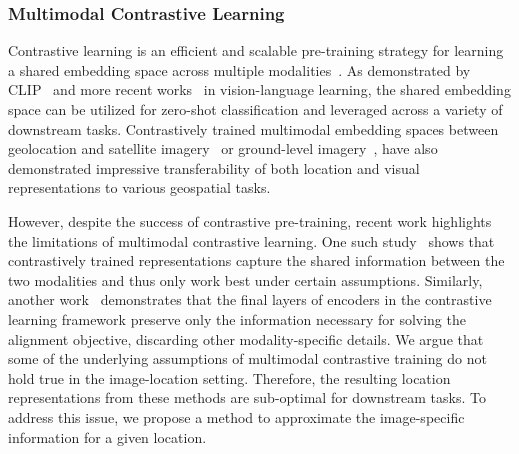 \subsubsection{Multimodal Contrastive Learning}
Contrastive learning is an efficient and scalable pre-training strategy for learning a shared embedding space across multiple modalities~\cite{radford2021learning,yang2022vision,yaofilip,li2021align,girdhar2023imagebind,elizalde2023clap,Dhakal_2024_CVPR,khanal2024psm,huynh2024contrastive,zheng2023exif}. As demonstrated by CLIP~\cite{radford2021learning} and more recent works~\cite{li2021align,yaofilip,yang2022vision} in vision-language learning, the shared embedding space can be utilized for zero-shot classification and leveraged across a variety of downstream tasks. Contrastively trained multimodal embedding spaces between geolocation and satellite imagery~\cite{klemmer2023satclip, mai2023csp} or ground-level imagery~\cite{vivanco2024geoclip}, have also demonstrated impressive transferability of both location and visual representations to various geospatial tasks.

However, despite the success of contrastive pre-training, recent work highlights the limitations of multimodal contrastive learning. One such study~\cite{liang2023factorized} shows that contrastively trained representations capture the shared information between the two modalities and thus only work best under certain assumptions. Similarly, another work~\cite{gupta2022understanding} demonstrates that the final layers of encoders in the contrastive learning framework preserve only the information necessary for solving the alignment objective, discarding other modality-specific details. We argue that some of the underlying assumptions of multimodal contrastive training do not hold true in the image-location setting. Therefore, the resulting location representations from these methods are sub-optimal for downstream tasks. To address this issue, we propose a method to approximate the image-specific information for a given location.


